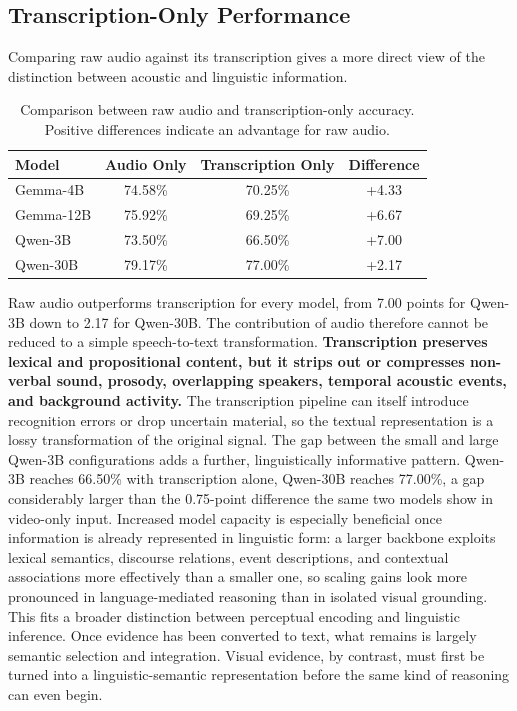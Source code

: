 \subsection*{Transcription-Only Performance}
\label{subsec:transcription_only}
Comparing raw audio against its transcription gives a more direct view of the distinction between acoustic and linguistic information.
\begin{table}[h]
    \centering
    \small
    \begin{tabular}{lccc}
        \hline
        \textbf{Model} &
        \textbf{Audio Only} &
        \textbf{Transcription Only} &
        \textbf{Difference} \\
        \hline
        Gemma-4B    & 74.58\% & 70.25\% & +4.33 \\
        Gemma-12B & 75.92\% & 69.25\% & +6.67 \\
        Qwen-3B & 73.50\% & 66.50\% & +7.00 \\
        Qwen-30B & 79.17\% & 77.00\% & +2.17 \\
        \hline
    \end{tabular}
    \caption{Comparison between raw audio and transcription-only accuracy. Positive differences indicate an advantage for raw audio.}
    \label{tab:audio_vs_transcription}
\end{table}
Raw audio outperforms transcription for every model, from 7.00 points for Qwen-3B down to 2.17 for Qwen-30B. The contribution of audio therefore cannot be reduced to a simple speech-to-text transformation. \textbf{Transcription preserves lexical and propositional content, but it strips out or compresses non-verbal sound, prosody, overlapping speakers, temporal acoustic events, and background activity.} The transcription pipeline can itself introduce recognition errors or drop uncertain material, so the textual representation is a lossy transformation of the original signal.
The gap between the small and large Qwen-3B configurations adds a further, linguistically informative pattern. Qwen-3B reaches 66.50\% with transcription alone, Qwen-30B reaches 77.00\%, a gap considerably larger than the 0.75-point difference the same two models show in video-only input. Increased model capacity is especially beneficial once information is already represented in linguistic form: a larger backbone exploits lexical semantics, discourse relations, event descriptions, and contextual associations more effectively than a smaller one, so scaling gains look more pronounced in language-mediated reasoning than in isolated visual grounding. This fits a broader distinction between perceptual encoding and linguistic inference. Once evidence has been converted to text, what remains is largely semantic selection and integration. Visual evidence, by contrast, must first be turned into a linguistic-semantic representation before the same kind of reasoning can even begin.
